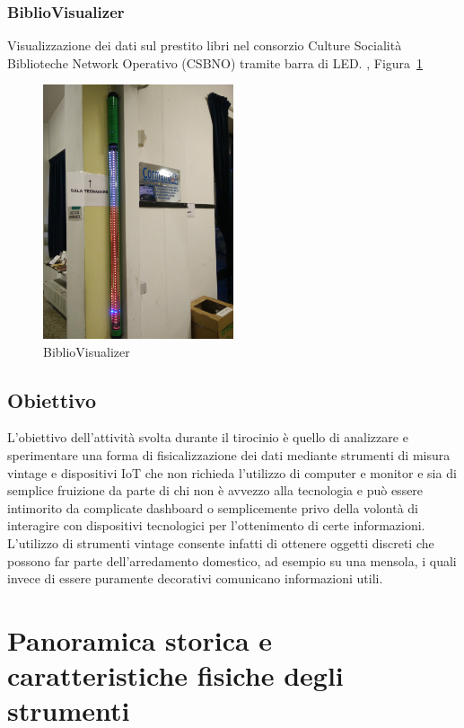 \documentclass[12pt,a4paper]{report}
\begin{document}
\subsection{BiblioVisualizer}
Visualizzazione dei dati sul prestito libri nel consorzio Culture Socialità Biblioteche Network Operativo (CSBNO) tramite barra di LED.
\cite{bibliovisgitlab}, Figura~\ref{fig:bibliovisualizer}
\begin{figure}[h]
  \centering
  \includegraphics[width=0.5\textwidth]{bibliovisualizer}
  \caption{BiblioVisualizer}
  \label{fig:bibliovisualizer}
\end{figure}



\section{Obiettivo}
L'obiettivo dell'attività svolta durante il tirocinio è quello di analizzare e sperimentare una forma di fisicalizzazione
dei dati mediante strumenti di misura vintage e dispositivi IoT che non richieda l'utilizzo di computer e monitor e sia di semplice fruizione
da parte di chi non è avvezzo alla tecnologia e può essere intimorito da complicate dashboard o semplicemente privo della volontà
di interagire con dispositivi tecnologici per l'ottenimento di certe informazioni. L'utilizzo di strumenti vintage consente infatti di ottenere
oggetti discreti che possono far parte dell'arredamento domestico, ad esempio su una mensola, i quali invece di essere puramente
decorativi comunicano informazioni utili.



\chapter{Panoramica storica e caratteristiche fisiche degli strumenti}
\end{document}

